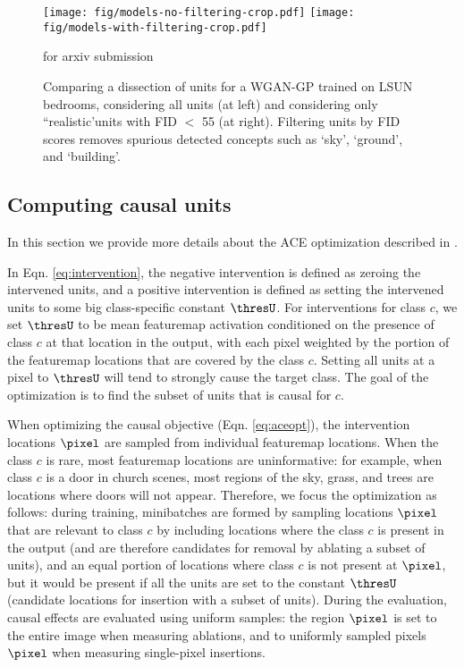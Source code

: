 \documentclass{article} %
\def\arxiv{for arxiv submission}
\begin{document}
\begin{figure}
\centering
\texttt{[image: fig/models-no-filtering-crop.pdf]}
\hspace{0.2in}
\texttt{[image: fig/models-with-filtering-crop.pdf]}
\caption{Comparing a dissection of units for a WGAN-GP trained on LSUN bedrooms, considering all units (at left) and considering only ``realistic’units with FID $<$ 55 (at right).  Filtering units by FID scores removes spurious detected concepts such as `sky', `ground', and `building'.}
\ifdefined\arxiv\else
\vspace{-3pt}
\fi\end{figure}\subsection{Computing causal units}
In this section we provide more details about the ACE optimization
described in .

  In Eqn. \ref{eq:intervention}, the negative intervention is defined as zeroing the intervened units, and a positive intervention is defined as setting the intervened units to some big class-specific constant $\thresU$.  For interventions for class $c$, we set $\thresU$ to be mean featuremap activation conditioned on the presence of class $c$ at that location in the output, with each pixel weighted by the portion of the featuremap locations that are covered by the class $c$.   Setting all units at a pixel to $\thresU$ will tend to strongly cause the target class. The goal of the optimization is to find the subset of units that is causal for $c$.

  When optimizing the causal objective (Eqn. \ref{eq:aceopt}), the intervention locations $\pixel$ are sampled from individual featuremap locations. When the class $c$ is rare, most featuremap locations are uninformative: for example, when class $c$ is a door in church scenes, most regions of the sky, grass, and trees are locations where doors will not appear.  Therefore, we focus the optimization as follows: during training, minibatches are formed by sampling locations $\pixel$ that are relevant to class $c$ by including locations where the class $c$ is present in the output (and are therefore candidates for removal by ablating a subset of units), and an equal portion of locations where class $c$ is not present at $\pixel$, but it would be present if all the units are set to the constant $\thresU$ (candidate locations for insertion with a subset of units).  During the evaluation, causal effects are evaluated using uniform samples: the region $\pixel$ is set to the entire image when measuring ablations, and to uniformly sampled pixels $\pixel$ when measuring single-pixel insertions.
\end{document}
